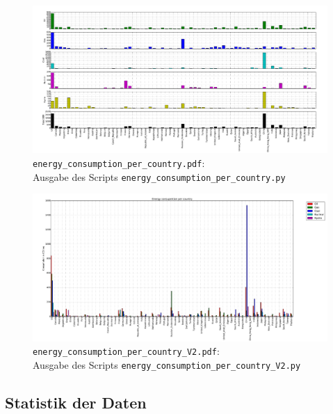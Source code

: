 \documentclass[12pt,a4paper]{scrartcl}
\begin{document}
\newpage
\begin{figure}[!h]
\includegraphics[width=\textwidth]{Plots/energy_consumption_per_country.pdf}
\caption{\lstinline{energy_consumption_per_country.pdf}: \\Ausgabe des Scripts \lstinline{energy_consumption_per_country.py}}
\end{figure}
\begin{figure}[!h]
\includegraphics[width=\textwidth]{Plots/energy_consupmtion_per_country_V2.pdf}
\caption{\lstinline{energy_consumption_per_country_V2.pdf}: \\Ausgabe des Scripts \lstinline{energy_consumption_per_country_V2.py}}
\end{figure}





\subsection*{Statistik der Daten}
\end{document}
